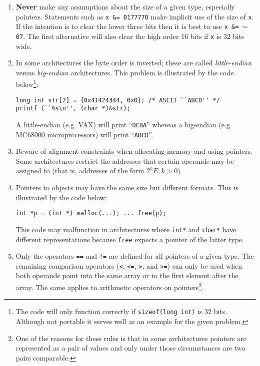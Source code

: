 \begin{enumerate}

\item {\bf Never} make any assumptions about the size of a given type,
 especially pointers. \cite{kn:style} Statements such as
 {\tt x \&= 0177770} make
 implicit use of the size of {\tt x}. If the intention is to clear the
 lower three bits then it is best to use {\tt x \&= $\sim$07}. The first
 alternative will also clear the high order 16 bits if {\tt x} is
 32 bits wide.

\item In some architectures the byte order is inverted; these are called
 {\em little-endian} versus {\em big-endian} architectures. This problem
 is illustrated by the code below\footnote{The code will only
 function correctly if {\tt sizeof(long int)} is 32 bits. Although not
 portable it serves well as an example for the given problem.}:
\begin{verbatim}
long int str[2] = {0x41424344, 0x0}; /* ASCII ``ABCD'' */
printf (``%s\n'', (char *)&str);
\end{verbatim}

A little-endian (e.g. VAX) will print ``{\tt DCBA}''
 whereas a big-endian (e.g. MC68000 microprocessors) will print ``{\tt ABCD}''.

\item Beware of alignment constraints when allocating memory and using
 pointers. Some
 architectures restrict the addresses that certain operands
 may be assigned to (that is, addresses of the form $2^k E, k > 0$).

\item \cite{kn:style} Pointers to objects may have the same size but
 different formats. This is illustrated by the code below:
\begin{verbatim}
int *p = (int *) malloc(...); ... free(p);
\end{verbatim}

This code may malfunction in architectures where {\tt int*} and {\tt char*}
have different representations because {\tt free} expects a pointer of
the latter type.

\item \cite{kn:style} Only the operators {\tt ==} and {\tt !=} are
 defined for all pointers of a given type. The remaining comparison
 operators ({\tt <}, {\tt <=}, {\tt >}, and {\tt >=}) can only be used when
 both operands point into the same array or to the first element after
 the array. The same applies to arithmetic operators on
 pointers\footnote{One of the reasons for these rules is that in some
 architectures pointers are represented as a pair of values and only
 under those circumstances are two pairs comparable.}.


\end{enumerate}
